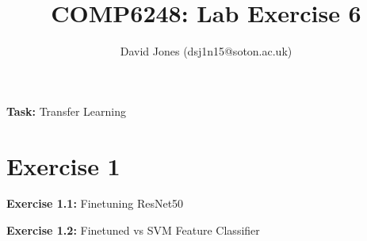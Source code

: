 \documentclass[11pt,a4paper]{article}
\title{COMP6248: Lab Exercise 6}
\author{
David Jones (dsj1n15@soton.ac.uk)}
\date{}
\begin{document}
\maketitle
\textbf{Task:} Transfer Learning
\vspace{-0.5em}
\section{Exercise 1}
\textbf{Exercise 1.1:} Finetuning ResNet50

\noindent\textbf{Exercise 1.2:} Finetuned vs SVM Feature Classifier
\end{document}
